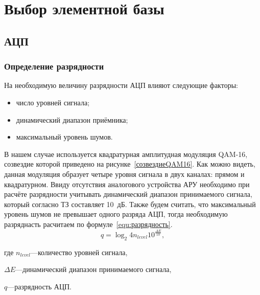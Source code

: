 \documentclass[utf8x, 14pt, oneside, a4paper]{article}
\begin{document}
	\pagebreak
	
	\section{Выбор элементной базы }
		\subsection{АЦП}
			\label{sect:ADC}
			\subsubsection{Определение разрядности}
				На необходимую величину разрядности АЦП влияют следующие факторы:
				\begin{itemize}
					\item число уровней сигнала;
					\item динамический диапазон приёмника;
					\item максимальный уровень шумов.
				\end{itemize}
			
				В нашем случае используется квадратурная амплитудная модуляция QAM-16, созвездие которой приведено на рисунке~\ref{созвездиеQAM16}. Как можно видеть, данная модуляция образует четыре уровня сигнала в двух каналах: прямом и квадратурном. Ввиду отсутствия аналогового устройства АРУ необходимо при расчёте разрядности учитывать динамический диапазон принимаемого сигнала, который согласно ТЗ составляет 10~дБ. Также будем считать, что максимальный уровень шумов не превышает одного разряда АЦП, тогда необходимую разряднасть расчитаем по формуле~\ref{equ:разрядность}.
				\begin{equation}\label{equ:разрядность}
					q =\log_2 4n_{level}10^{\frac{\Delta{}E}{10}},
				\end{equation}
			
					где $n_{level}$---количество уровней сигнала,
					
					$\Delta{}E$---динамический диапазон принимаемого сигнала,
					
					$q$---разрядность АЦП.
			
\end{document}
